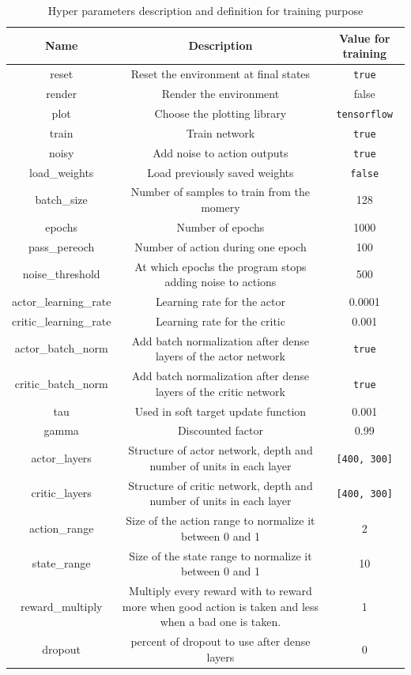 \documentclass{article}
\begin{document}
\begin{table}[ht]
  \centering
  \begin{adjustbox}{width=1\textwidth}
    \begin{tabular}{ |c|c|c| }
      \hline
      \textbf{Name} & \textbf{Description} & \textbf{Value for training} \\
      \hline
      reset & Reset the environment at final states & \verb?true? \\ 
      render & Render the environment\footnotemark & false \\
      plot & Choose the plotting library & \verb?tensorflow? \\
      train & Train network & \verb?true? \\
      noisy & Add noise to action outputs & \verb?true? \\
      load\_weights & Load previously saved weights & \verb?false? \\
      batch\_size & Number of samples to train from the momery & 128 \\
      epochs & Number of epochs & 1000 \\
      pass_pereoch & Number of action during one epoch & 100 \\ 
      noise\_threshold & At which epochs the program stops adding noise to actions & 500 \\
      actor\_learning\_rate & Learning rate for the actor & 0.0001 \\
      critic\_learning\_rate & Learning rate for the critic & 0.001 \\
      actor\_batch\_norm & Add batch normalization after dense layers of the actor network & \verb?true? \\
      critic\_batch\_norm & Add batch normalization after dense layers of the critic network & \verb?true? \\
      tau & Used in soft target update function & 0.001 \\
      gamma & Discounted factor & 0.99 \\
      actor\_layers & Structure of actor network, depth and number of units in each layer & \verb?[400, 300]? \\
      critic\_layers & Structure of critic network, depth and number of units in each layer & \verb?[400, 300]? \\
      action\_range & Size of the action range to normalize it between 0 and 1 & 2 \\
      state\_range & Size of the state range to normalize it between 0 and 1 & 10 \\
      reward\_multiply & Multiply every reward with to reward more when good action is taken and less when a bad one is taken. & 1 \\
      dropout & percent of dropout to use after dense layers & 0 \\
      \hline
    \end{tabular}
  \end{adjustbox}
  \caption{Hyper parameters description and definition for training purpose}
  \label{tab:hyperparams}
\end{table}
\end{document}
